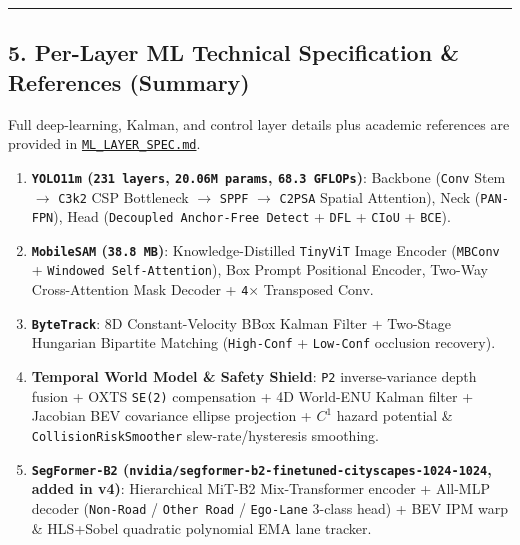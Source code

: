 \documentclass[10.5pt,a4paper]{article}
\begin{document}
\par\noindent\rule{\textwidth}{0.4pt}\par\medskip

\subsection{5. Per-Layer ML Technical Specification \& References (Summary)}

Full deep-learning, Kalman, and control layer details plus academic references are provided in \href{https://github.com/Heisnotanimposter/Totalcare\_autonomous\_driving\_Yolov5/blob/main/ML\_LAYER\_SPEC.md}{\texttt{ML\_\allowbreak{}LAYER\_\allowbreak{}SPEC.\allowbreak{}md}}.


\begin{enumerate}[leftmargin=1.8em,itemsep=2pt]
\item \textbf{\texttt{YOLO11m} (\texttt{231 layers}, \texttt{20.\allowbreak{}06M params}, \texttt{68.\allowbreak{}3 GFLOPs})}: Backbone (\texttt{Conv} Stem $\rightarrow$ \texttt{C3k2} CSP Bottleneck $\rightarrow$ \texttt{SPPF} $\rightarrow$ \texttt{C2PSA} Spatial Attention), Neck (\texttt{PAN-\allowbreak{}FPN}), Head (\texttt{Decoupled Anchor-\allowbreak{}Free Detect} + \texttt{DFL} + \texttt{CIoU} + \texttt{BCE}).
\item \textbf{\texttt{MobileSAM} (\texttt{38.\allowbreak{}8 MB})}: Knowledge-Distilled \texttt{TinyViT} Image Encoder (\texttt{MBConv} + \texttt{Windowed Self-\allowbreak{}Attention}), Box Prompt Positional Encoder, Two-Way Cross-Attention Mask Decoder + \texttt{4$\times$} Transposed Conv.
\item \textbf{\texttt{ByteTrack}}: 8D Constant-Velocity BBox Kalman Filter + Two-Stage Hungarian Bipartite Matching (\texttt{High-\allowbreak{}Conf} + \texttt{Low-\allowbreak{}Conf} occlusion recovery).
\item \textbf{Temporal World Model \& Safety Shield}: \texttt{P2} inverse-variance depth fusion + OXTS \texttt{SE(2)} compensation + 4D World-ENU Kalman filter + Jacobian BEV covariance ellipse projection + $C^1$ hazard potential \& \texttt{CollisionRiskSmoother} slew-rate/hysteresis smoothing.
\item \textbf{\texttt{SegFormer-\allowbreak{}B2} (\texttt{nvidia/\allowbreak{}segformer-\allowbreak{}b2-\allowbreak{}finetuned-\allowbreak{}cityscapes-\allowbreak{}1024-\allowbreak{}1024}, added in v4)}: Hierarchical MiT-B2 Mix-Transformer encoder + All-MLP decoder (\texttt{Non-\allowbreak{}Road} / \texttt{Other Road} / \texttt{Ego-\allowbreak{}Lane} 3-class head) + BEV IPM warp \& HLS+Sobel quadratic polynomial EMA lane tracker.
\end{enumerate}
\end{document}
